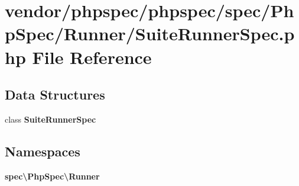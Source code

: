\section{vendor/phpspec/phpspec/spec/\+Php\+Spec/\+Runner/\+Suite\+Runner\+Spec.php File Reference}
\label{_suite_runner_spec_8php}
\subsection*{Data Structures}
\begin{DoxyCompactItemize}
\item 
class {\bf Suite\+Runner\+Spec}
\end{DoxyCompactItemize}
\subsection*{Namespaces}
\begin{DoxyCompactItemize}
\item 
 {\bf spec\textbackslash{}\+Php\+Spec\textbackslash{}\+Runner}
\end{DoxyCompactItemize}
